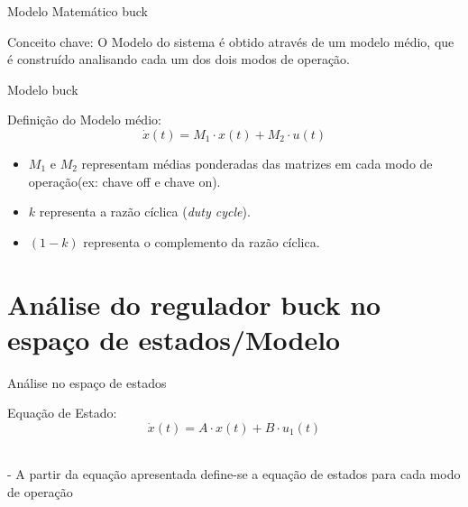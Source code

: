 \documentclass[aspectratio=169]{beamer}
\begin{document}
\begin{frame}{Modelo Matemático buck}
  
  \begin{block}{Conceito chave:}
    O Modelo do sistema é obtido através de um modelo médio, que é construído analisando cada um dos dois modos de operação.
  \end{block}
\end{frame}

\begin{frame}{Modelo buck}
  
  \begin{block}{Definição do Modelo médio:}
    $$\dot{x}(t) = M_1 \cdot x(t) + M_2 \cdot u(t)$$
  \end{block}
\begin{itemize}
        \item $M_1$ e $M_2$ representam médias ponderadas das matrizes em cada modo de operação(ex: chave off e chave on).
        \item $k$ representa a razão cíclica (\textit{duty cycle}).
        \item $(1 - k)$ representa o complemento da razão cíclica.
    \end{itemize}

\end{frame}


\section{Análise do regulador buck no espaço de estados/Modelo}

\begin{frame}{Análise no espaço de estados}

 \begin{block}{Equação de Estado:}
   $$\dot{x}(t) = A \cdot x(t) + B \cdot u_1(t)$$
  \end{block}
\\
  - A partir da equação apresentada define-se a equação de estados para cada modo de operação
  \\

  \end{frame}
\end{document}
